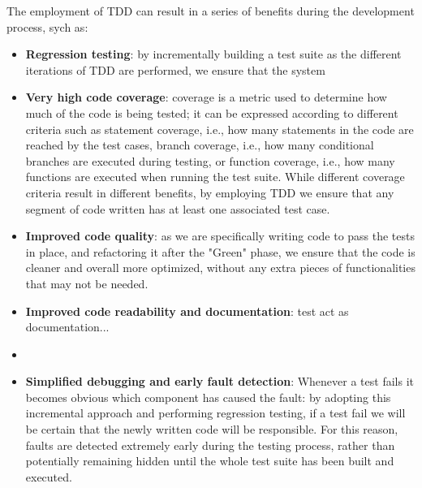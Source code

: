 The employment of TDD can result in a series of benefits during the development process, sych as:
\begin{itemize}
    \item \textbf{Regression testing}: by incrementally building a test suite as the different iterations of TDD are performed, we ensure that the system  
    \item \textbf{Very high code coverage}: coverage is a metric used to determine how much of the code is being tested; it can be expressed according to different criteria such as statement coverage, i.e., how many statements in the code are reached by the test cases, branch coverage, i.e., how many conditional branches are executed during testing, or function coverage, i.e., how many functions are executed when running the test suite. While different coverage criteria result in different benefits, by employing TDD we ensure that any segment of code written has at least one associated test case.
    \item \textbf{Improved code quality}: as we are specifically writing code to pass the tests in place, and refactoring it after the "Green" phase, we ensure that the code is cleaner and overall more optimized, without any extra pieces of functionalities that may not be needed. 
    \item \textbf{Improved code readability and documentation}: test act as documentation...
    \item \item \textbf{Simplified debugging and early fault detection}: Whenever a test fails it becomes obvious which component has caused the fault: by adopting this incremental approach and performing regression testing, if a test fail we will be certain that the newly written code will be responsible. For this reason, faults are detected extremely early during the testing process, rather than potentially remaining hidden until the whole test suite has been built and executed.
\end{itemize}


